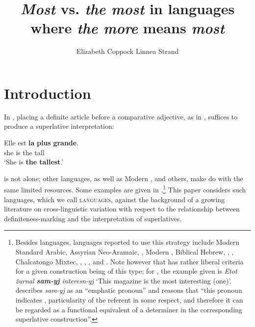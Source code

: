 \documentclass[output=paper
,modfonts
,nonflat]{langsci/langscibook}
\title{\texorpdfstring{\textit{Most} vs. \textit{the most} in languages where \textit{the more} means \textit{most}}{`{Most}' vs. `{the most}' in languages where `{the more}' means `{most}'}}
\author{%
 Elizabeth Coppock\affiliation{Boston University \\ University of Gothenburg}\lastand 
 Linnea Strand\affiliation{University of Gothenburg}
}
\begin{document}

\maketitle
\section{Introduction} 
In , placing a definite article before a comparative adjective, as in , suffices to produce a superlative interpretation:

\ea \label{ex:coppockstrand:1}
\gll Elle est \textbf{la} \textbf{plus} \textbf{grande}.\\
she is the \cmpr{} tall\\ 
\glt `She is \textbf{the tallest}.' 
\z

 is not alone; other  languages, as well as Modern ,  and others, make do with the same limited resources. Some examples are given in .\footnote{Besides  languages, languages reported to use this strategy include 
Modern Standard Arabic, Assyrian Neo-Aramaic, , Modern , Biblical Hebrew, , , Chalcatongo Mixtec, , , , and  \citep{Bobaljik2012,Gorshenin2012}. Note however that \citeauthor{Gorshenin2012} has rather liberal criteria for a given construction being of this type; for , the example given is \textit{Etot \v{z}urnal \textbf{sam-yj} interesn-yj} `This magazine is the most interesting (one)'. \citet[129]{Gorshenin2012} describes \textit{sam-yj} as an ``emphatic pronoun'' and reasons that ``this pronoun indicates , particularity of the referent in some respect, and therefore it can be regarded as a functional equivalent of a determiner in the corresponding superlative construction''.} This paper considers such languages, which we call  \textsc{languages}, against the background of a growing literature on cross-linguistic variation with respect to the relationship between definiteness-marking and the interpretation of superlatives.
\end{document}
